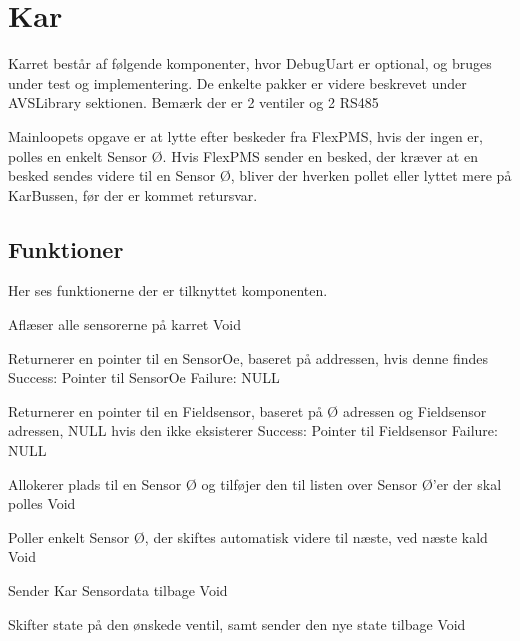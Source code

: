 \section{Kar}

Karret består af følgende komponenter, 
hvor DebugUart er optional, og bruges under 
test og implementering. De enkelte pakker er 
videre beskrevet under AVSLibrary sektionen. 
Bemærk der er 2 ventiler og 2 RS485


Mainloopets opgave er at lytte efter beskeder fra FlexPMS, 
hvis der ingen er, polles en enkelt Sensor Ø. Hvis FlexPMS 
sender en besked, der kræver at en besked sendes videre til 
en Sensor Ø, bliver der hverken pollet eller lyttet mere 
på KarBussen, før der er kommet retursvar.


\subsection{Funktioner}
Her ses funktionerne der er tilknyttet komponenten.

{Aflæser alle sensorerne på karret}
{Void}
{}

{Returnerer en pointer til en SensorOe, baseret på addressen, hvis denne findes}
{Success: Pointer til SensorOe Failure: NULL}
{
}

{Returnerer en pointer til en Fieldsensor, baseret på Ø adressen og Fieldsensor adressen, NULL hvis den ikke eksisterer}
{Success: Pointer til Fieldsensor Failure: NULL}
{
}

{Allokerer plads til en Sensor Ø og tilføjer den til listen over Sensor Ø'er der skal polles}
{Void}
{
}

{Poller enkelt Sensor Ø, der skiftes automatisk videre til næste, ved næste kald}
{Void}
{}

{Sender Kar Sensordata tilbage}
{Void}
{
}

{Skifter state på den ønskede ventil, samt sender den nye state tilbage}
{Void}
{
}

